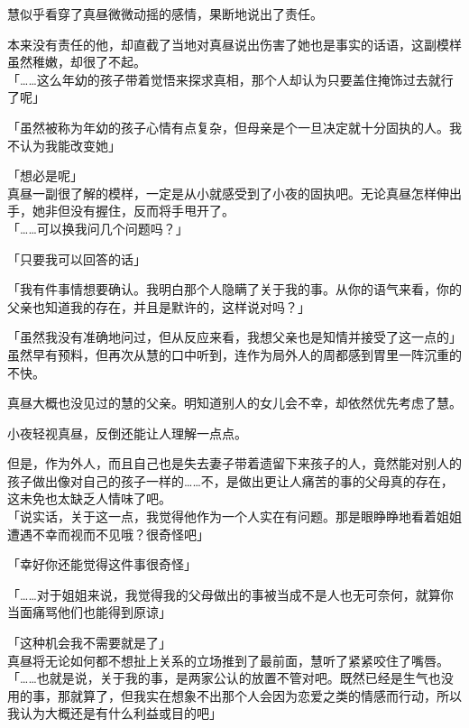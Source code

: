 慧似乎看穿了真昼微微动摇的感情，果断地说出了责任。

本来没有责任的他，却直截了当地对真昼说出伤害了她也是事实的话语，这副模样虽然稚嫩，却很了不起。\\

「……这么年幼的孩子带着觉悟来探求真相，那个人却认为只要盖住掩饰过去就行了呢」

「虽然被称为年幼的孩子心情有点复杂，但母亲是个一旦决定就十分固执的人。我不认为我能改变她」

「想必是呢」\\

真昼一副很了解的模样，一定是从小就感受到了小夜的固执吧。无论真昼怎样伸出手，她非但没有握住，反而将手甩开了。\\

「……可以换我问几个问题吗？」

「只要我可以回答的话」

「我有件事情想要确认。我明白那个人隐瞒了关于我的事。从你的语气来看，你的父亲也知道我的存在，并且是默许的，这样说对吗？」

「虽然我没有准确地问过，但从反应来看，我想父亲也是知情并接受了这一点的」\\

虽然早有预料，但再次从慧的口中听到，连作为局外人的周都感到胃里一阵沉重的不快。

真昼大概也没见过的慧的父亲。明知道别人的女儿会不幸，却依然优先考虑了慧。

小夜轻视真昼，反倒还能让人理解一点点。

但是，作为外人，而且自己也是失去妻子带着遗留下来孩子的人，竟然能对别人的孩子做出像对自己的孩子一样的……不，是做出更让人痛苦的事的父母真的存在，这未免也太缺乏人情味了吧。\\

「说实话，关于这一点，我觉得他作为一个人实在有问题。那是眼睁睁地看着姐姐遭遇不幸而视而不见哦？很奇怪吧」

「幸好你还能觉得这件事很奇怪」

「……对于姐姐来说，我觉得我的父母做出的事被当成不是人也无可奈何，就算你当面痛骂他们也能得到原谅」

「这种机会我不需要就是了」\\

真昼将无论如何都不想扯上关系的立场推到了最前面，慧听了紧紧咬住了嘴唇。\\

「……也就是说，关于我的事，是两家公认的放置不管对吧。既然已经是生气也没用的事，那就算了，但我实在想象不出那个人会因为恋爱之类的情感而行动，所以我认为大概还是有什么利益或目的吧」

